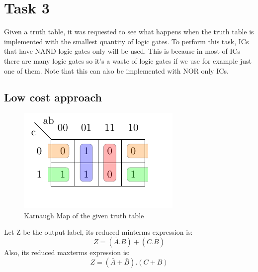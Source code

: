 \newpage


\section*{Task 3}

Given a truth table, it was requested to see what happens
when the truth table is implemented with the smallest quantity of logic
gates. To perform this task, ICs that have NAND logic gates only
 will be used. This is because in most of ICs there are many
logic gates so it's a waste of logic gates if we use for example
just one of them. Note that this can also be implemented with 
NOR only ICs.

\subsection*{Low cost approach}
\begin{figure}[htbp]
    \begin{center}
    \includegraphics{data/karnaugh.pdf}
    
    \end{center}
    
    \caption{Karnaugh Map of the given truth table}
    \label{fig:KarnaughMap}
    \end{figure}
Let Z be the output label, its reduced minterms expression is:
\begin{equation}
    Z= (\bar{A}.B)+(C.\bar{B})
\end{equation} 
Also, its reduced maxterms expression is:
\begin{equation}
    Z= (\bar{A}+\bar{B}).(C+B)
\end{equation} 
